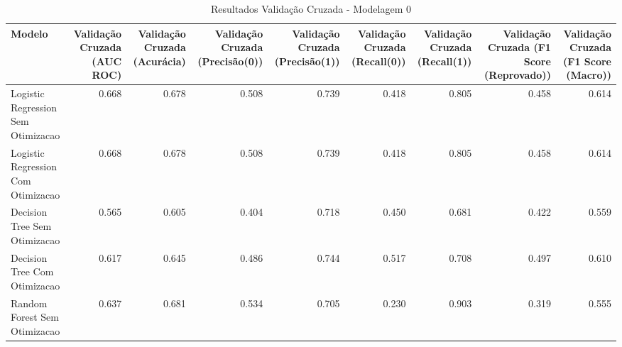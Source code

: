 \begin{table}[H] %
    \centering
    \caption{Resultados Validação Cruzada - Modelagem 0}
    \label{tab:resultados_cv_modelagem_0}
    \renewcommand{\arraystretch}{1.25} %
    \begin{adjustwidth}{ -1in }{ -1in } %
    \centering %
    \small %
    \begin{tabular}{lrrrrrrrr}
\toprule
                            Modelo &  Validação Cruzada (AUC ROC) &  Validação Cruzada (Acurácia) &  Validação Cruzada (Precisão(0)) &  Validação Cruzada (Precisão(1)) &  Validação Cruzada (Recall(0)) &  Validação Cruzada (Recall(1)) &  Validação Cruzada (F1 Score (Reprovado)) &  Validação Cruzada (F1 Score (Macro)) \\
\midrule
Logistic Regression Sem Otimizacao &                        0.668 &                         0.678 &                            0.508 &                            0.739 &                          0.418 &                          0.805 &                                     0.458 &                                 0.614 \\
Logistic Regression Com Otimizacao &                        0.668 &                         0.678 &                            0.508 &                            0.739 &                          0.418 &                          0.805 &                                     0.458 &                                 0.614 \\
      Decision Tree Sem Otimizacao &                        0.565 &                         0.605 &                            0.404 &                            0.718 &                          0.450 &                          0.681 &                                     0.422 &                                 0.559 \\
      Decision Tree Com Otimizacao &                        0.617 &                         0.645 &                            0.486 &                            0.744 &                          0.517 &                          0.708 &                                     0.497 &                                 0.610 \\
      Random Forest Sem Otimizacao &                        0.637 &                         0.681 &                            0.534 &                            0.705 &                          0.230 &                          0.903 &                                     0.319 &                                 0.555 \\

\end{tabular}
\end{adjustwidth}
\end{table}
